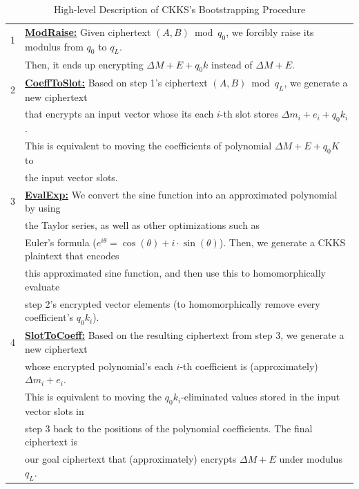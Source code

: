 \begin{table}
\begin{tabular}{|ll|}
\hline
1& \textsf{\textbf{\underline{ModRaise:}}} Given ciphertext $(A, B) \bmod q_0$, we forcibly raise its modulus from $q_0$ to $q_L$. \\
& Then, it ends up encrypting $\Delta M + E + q_0k$ instead of $\Delta M + E$.\\
2& \textsf{\textbf{\underline{CoeffToSlot:}}} Based on step 1's ciphertext $(A, B) \bmod q_L$, we generate a new ciphertext\\
& that encrypts an input vector whose its each $i$-th slot stores $\Delta m_i + e_i + q_0k_i$.\\
& This is equivalent to moving the coefficients of polynomial $\Delta M + E + q_0K$ to\\
& the input vector slots.\\
3& \textsf{\textbf{\underline{EvalExp:}}} We convert the sine function into an approximated polynomial by using \\
& the Taylor series, as well as other optimizations such as\\ 
& Euler's formula ($e^{i\theta} = \cos(\theta) + i\cdot\sin(\theta)$). Then, we generate a CKKS plaintext that encodes \\
& this approximated sine function, and then use this to homomorphically evaluate \\
& step 2's encrypted vector elements (to homomorphically remove every coefficient's $q_0k_i$).\\
4& \textsf{\textbf{\underline{SlotToCoeff:}}} Based on the resulting ciphertext from step 3, we generate a new ciphertext \\
& whose encrypted polynomial's each $i$-th coefficient is (approximately) $\Delta m_i + e_i$. \\
& This is equivalent to moving the $q_0k_i$-eliminated values stored in the input vector slots in \\
&step 3 back to the positions of the polynomial coefficients. The final ciphertext is \\
& our goal ciphertext that (approximately) encrypts $\Delta M + E$ under modulus $q_L$.\\
\hline
\end{tabular}
\caption{High-level Description of CKKS's Bootstrapping Procedure}
\label{tab:ckks-bootstrapping-procedure}
\end{table}

